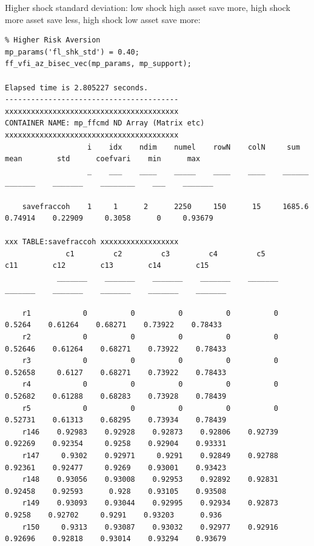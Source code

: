 \documentclass[
]{book}
\begin{document}
Higher shock standard deviation: low shock high asset save more, high
shock more asset save less, high shock low asset save more:

\begin{verbatim}
% Higher Risk Aversion
mp_params('fl_shk_std') = 0.40;
ff_vfi_az_bisec_vec(mp_params, mp_support);

Elapsed time is 2.805227 seconds.
----------------------------------------
xxxxxxxxxxxxxxxxxxxxxxxxxxxxxxxxxxxxxxxx
CONTAINER NAME: mp_ffcmd ND Array (Matrix etc)
xxxxxxxxxxxxxxxxxxxxxxxxxxxxxxxxxxxxxxxx
                   i    idx    ndim    numel    rowN    colN     sum       mean        std      coefvari    min      max  
                   _    ___    ____    _____    ____    ____    ______    _______    _______    ________    ___    _______

    savefraccoh    1     1      2      2250     150      15     1685.6    0.74914    0.22909     0.3058      0     0.93679

xxx TABLE:savefraccoh xxxxxxxxxxxxxxxxxx
              c1         c2         c3         c4         c5         c11        c12        c13        c14        c15  
            _______    _______    _______    _______    _______    _______    _______    _______    _______    _______

    r1            0          0          0          0          0     0.5264    0.61264    0.68271    0.73922    0.78433
    r2            0          0          0          0          0    0.52646    0.61264    0.68271    0.73922    0.78433
    r3            0          0          0          0          0    0.52658     0.6127    0.68271    0.73922    0.78433
    r4            0          0          0          0          0    0.52682    0.61288    0.68283    0.73928    0.78439
    r5            0          0          0          0          0    0.52731    0.61313    0.68295    0.73934    0.78439
    r146    0.92983    0.92928    0.92873    0.92806    0.92739    0.92269    0.92354     0.9258    0.92904    0.93331
    r147     0.9302    0.92971     0.9291    0.92849    0.92788    0.92361    0.92477     0.9269    0.93001    0.93423
    r148    0.93056    0.93008    0.92953    0.92892    0.92831    0.92458    0.92593      0.928    0.93105    0.93508
    r149    0.93093    0.93044    0.92995    0.92934    0.92873     0.9258    0.92702     0.9291    0.93203      0.936
    r150     0.9313    0.93087    0.93032    0.92977    0.92916    0.92696    0.92818    0.93014    0.93294    0.93679
\end{verbatim}
\end{document}
